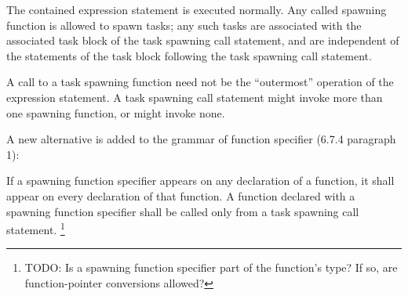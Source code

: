 
\pnum
The contained expression statement is executed normally.
Any called spawning function is allowed to spawn tasks;
any such tasks are associated with the associated task block
of the task spawning call statement,
and are
independent of
the statements of the task block
following the task spawning call statement.

\begin{note}
A call to a task spawning function need not be
the ``outermost'' operation of the expression statement.
A task spawning call statement
might invoke more than one spawning function,
or might invoke none.
\end{note}

\pnum
A new alternative is added to the grammar of function specifier
(6.7.4 paragraph 1):

\begin{bnf}
\br
{} 
\end{bnf}

\pnum
If a spawning function specifier appears
on any declaration of a function,
it shall appear on every declaration of that function.
A function declared with a spawning function specifier
shall be called only from a task spawning call statement.
\footnote{TODO:
Is a spawning function specifier part of the function's type?
If so, are function-pointer conversions allowed?
}